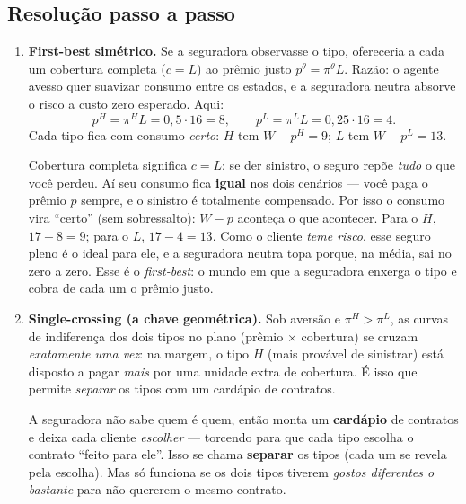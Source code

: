 \documentclass[11pt,a4paper]{article}
\newcommand{\dc}[2]{#1{,}#2}
\begin{document}
\subsection*{Resolução passo a passo}
\begin{enumerate}[leftmargin=2em,itemsep=4pt]

\item \textbf{First-best simétrico.} Se a seguradora observasse o tipo, ofereceria a cada
um cobertura completa ($c=L$) ao prêmio justo $p^\theta = \pi^\theta L$. Razão: o agente
avesso quer suavizar consumo entre os estados, e a seguradora neutra absorve o risco a
custo zero esperado. Aqui:
\[
p^H = \pi^H L = \dc{0}{5}\cdot 16 = 8, \qquad
p^L = \pi^L L = \dc{0}{25}\cdot 16 = 4. \tag{3.1}
\]
Cada tipo fica com consumo \emph{certo}: $H$ tem $W-p^H = 9$; $L$ tem $W-p^L = 13$.

\begin{empalavras}
Cobertura completa significa $c = L$: se der sinistro, o seguro repõe \emph{tudo} o que você
perdeu. Aí seu consumo fica \textbf{igual} nos dois cenários — você paga o prêmio $p$
sempre, e o sinistro é totalmente compensado. Por isso o consumo vira ``certo'' (sem
sobressalto): $W - p$ aconteça o que acontecer. Para o $H$, $17 - 8 = 9$; para o $L$, $17 -
4 = 13$. Como o cliente \emph{teme risco}, esse seguro pleno é o ideal para ele, e a
seguradora neutra topa porque, na média, sai no zero a zero. Esse é o \emph{first-best}: o
mundo em que a seguradora enxerga o tipo e cobra de cada um o prêmio justo.
\end{empalavras}

\item \textbf{Single-crossing (a chave geométrica).} Sob aversão e $\pi^H>\pi^L$, as
curvas de indiferença dos dois tipos no plano (prêmio $\times$ cobertura) se cruzam
\emph{exatamente uma vez}: na margem, o tipo $H$ (mais provável de sinistrar) está disposto
a pagar \emph{mais} por uma unidade extra de cobertura. É isso que permite \emph{separar}
os tipos com um cardápio de contratos.

\begin{empalavras}
A seguradora não sabe quem é quem, então monta um \textbf{cardápio} de contratos e deixa
cada cliente \emph{escolher} — torcendo para que cada tipo escolha o contrato ``feito para
ele''. Isso se chama \textbf{separar} os tipos (cada um se revela pela escolha). Mas só
funciona se os dois tipos tiverem \emph{gostos diferentes o bastante} para não quererem o
mesmo contrato.


\end{empalavras}
\end{enumerate}
\end{document}
